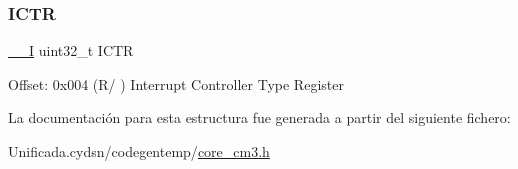 \subsubsection{\texorpdfstring{I\+C\+TR}{ICTR}}
{\footnotesize\ttfamily \mbox{\hyperlink{core__cm3_8h_af63697ed9952cc71e1225efe205f6cd3}{\+\_\+\+\_\+I}} uint32\+\_\+t I\+C\+TR}

Offset\+: 0x004 (R/ ) Interrupt Controller Type Register 

La documentación para esta estructura fue generada a partir del siguiente fichero\+:\begin{DoxyCompactItemize}
\item 
Unificada.\+cydsn/codegentemp/\mbox{\hyperlink{core__cm3_8h}{core\+\_\+cm3.\+h}}\end{DoxyCompactItemize}
